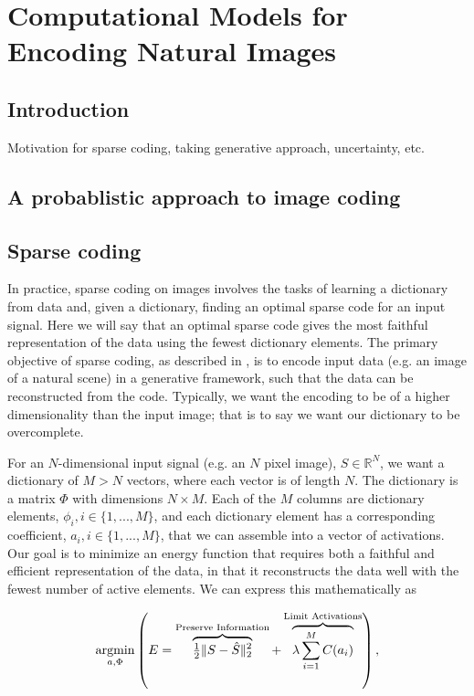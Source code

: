 \chapter{Computational Models for Encoding Natural Images}


\section{Introduction}
Motivation for sparse coding, taking generative approach, uncertainty, etc.

\section{A probablistic approach to image coding}

\section{Sparse coding}
In practice, sparse coding on images involves the tasks of learning a dictionary from data and, given a dictionary, finding an optimal sparse code for an input signal. Here we will say that an optimal sparse code gives the most faithful representation of the data using the fewest dictionary elements. The primary objective of sparse coding, as described in \cite{olshausen1997sparse}, is to encode input data (e.g. an image of a natural scene) in a generative framework, such that the data can be reconstructed from the code. Typically, we want the encoding to be of a higher dimensionality than the input image; that is to say we want our dictionary to be overcomplete.

For an $N$-dimensional input signal (e.g. an $N$ pixel image), $S \in \mathbb{R}^{N}$, we want a dictionary of $M > N$ vectors, where each vector is of length $N$. The dictionary is a matrix $\Phi$ with dimensions $N \times M$. Each of the $M$ columns are dictionary elements, $\phi_{i}, i \in \{1,...,M\}$, and each dictionary element has a corresponding coefficient, $a_{i}, i \in \{1,...,M\}$, that we can assemble into a vector of activations. Our goal is to minimize an energy function that requires both a faithful and efficient representation of the data, in that it reconstructs the data well with the fewest number of active elements. We can express this mathematically as

\begin{equation}\label{eq:ch2_sparse_energy}
    \argmin\limits_{a, \Phi}
        \left( E =
            \overbrace{ \tfrac{1}{2} \| S - \hat{S} \|_{2}^{2} }^\text{Preserve Information} +
        \overbrace{ \lambda \sum\limits_{i=1}^{M}C(a_{i}) }^\text{Limit Activations} \right),
\end{equation}

